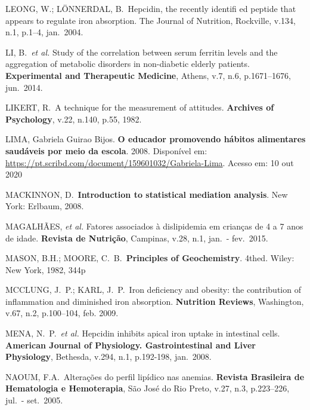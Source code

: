 \bigbreak

\noindent LEONG, W.; LÖNNERDAL, B.\ Hepcidin, the recently identifi ed peptide that appears to regulate iron absorption. The Journal of Nutrition, Rockville, v.134, n.1, p.1--4, jan.\ 2004.

\bigbreak

\noindent LI, B.\ \textit{et al.} Study of the correlation between serum ferritin levels and the aggregation of metabolic disorders in non-diabetic elderly patients. \textbf{Experimental and Therapeutic Medicine}, Athens, v.7, n.6, p.1671--1676, jun.\ 2014.

\bigbreak

\noindent LIKERT, R.\ A technique for the measurement of attitudes. \textbf{Archives of Psychology}, v.22, n.140, p.55, 1982. 

\bigbreak

\noindent LIMA, Gabriela Guirao Bijos. \textbf{O educador promovendo hábitos alimentares saudáveis por meio da escola}. 2008. Disponível em: \url{https://pt.scribd.com/document/159601032/Gabriela-Lima}. Acesso em: 10 out 2020

\bigbreak

\noindent MACKINNON, D.\ \textbf{Introduction to statistical mediation analysis}. New York: Erlbaum, 2008.

\bigbreak

\noindent MAGALHÃES, \textit{et al.} Fatores associados à dislipidemia em crianças de 4 a 7 anos de idade. \textbf{Revista de Nutrição}, Campinas, v.28, n.1, jan.\ - fev.\ 2015.

\bigbreak

\noindent MASON, B.H.; MOORE, C.\ B.\ \textbf{Principles of Geochemistry}. 4thed. Wiley: New York, 1982, 344p 

\bigbreak

\noindent MCCLUNG, J.\ P.; KARL, J.\ P.\ Iron deficiency and obesity: the contribution of inflammation and diminished iron absorption. \textbf{Nutrition Reviews}, Washington, v.67, n.2, p.100--104, feb. 2009.

\bigbreak

\noindent MENA, N.\ P.\ \textit{et al.} Hepcidin inhibits apical iron uptake in intestinal cells. \textbf{American Journal of Physiology. Gastrointestinal and Liver Physiology}, Bethesda, v.294, n.1, p.192-198, jan.\ 2008. 

\bigbreak

\noindent NAOUM, F.A.\ Alterações do perfil lipídico nas anemias. \textbf{Revista Brasileira de Hematologia e Hemoterapia}, São José do Rio Preto, v.27, n.3, p.223--226, jul.\ - set.\ 2005.

